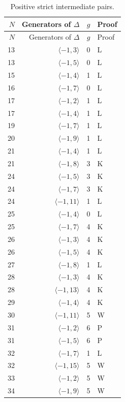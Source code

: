 \begin{longtable}{rrrl}
\caption{Positive strict intermediate pairs.}\label{tab:positive}\\
\toprule
$N$ & Generators of $\Delta$ & $g$ & Proof \\
\midrule\endfirsthead
\toprule $N$ & Generators of $\Delta$ & $g$ & Proof \\
\midrule\endhead
13 & $\langle -1, 3\rangle$ & 0 & L \\
13 & $\langle -1, 5\rangle$ & 0 & L \\
15 & $\langle -1, 4\rangle$ & 1 & L \\
16 & $\langle -1, 7\rangle$ & 0 & L \\
17 & $\langle -1, 2\rangle$ & 1 & L \\
17 & $\langle -1, 4\rangle$ & 1 & L \\
19 & $\langle -1, 7\rangle$ & 1 & L \\
20 & $\langle -1, 9\rangle$ & 1 & L \\
21 & $\langle -1, 4\rangle$ & 1 & L \\
21 & $\langle -1, 8\rangle$ & 3 & K \\
24 & $\langle -1, 5\rangle$ & 3 & K \\
24 & $\langle -1, 7\rangle$ & 3 & K \\
24 & $\langle -1, 11\rangle$ & 1 & L \\
25 & $\langle -1, 4\rangle$ & 0 & L \\
25 & $\langle -1, 7\rangle$ & 4 & K \\
26 & $\langle -1, 3\rangle$ & 4 & K \\
26 & $\langle -1, 5\rangle$ & 4 & K \\
27 & $\langle -1, 8\rangle$ & 1 & L \\
28 & $\langle -1, 3\rangle$ & 4 & K \\
28 & $\langle -1, 13\rangle$ & 4 & K \\
29 & $\langle -1, 4\rangle$ & 4 & K \\
30 & $\langle -1, 11\rangle$ & 5 & W \\
31 & $\langle -1, 2\rangle$ & 6 & P \\
31 & $\langle -1, 5\rangle$ & 6 & P \\
32 & $\langle -1, 7\rangle$ & 1 & L \\
32 & $\langle -1, 15\rangle$ & 5 & W \\
33 & $\langle -1, 2\rangle$ & 5 & W \\
34 & $\langle -1, 9\rangle$ & 5 & W \\

\end{longtable}
